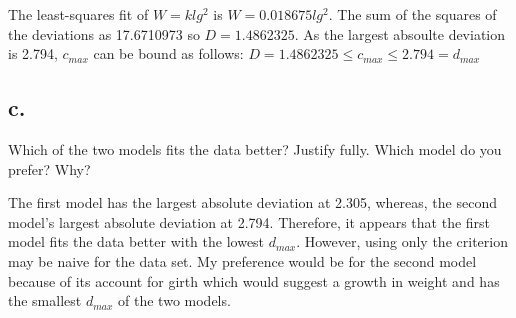 \documentclass[]{article}
\begin{document}
The least-squares fit of \(W = klg^2\) is \(W = 0.018675lg^2\). The sum
of the squares of the deviations as 17.6710973 so \(D = 1.4862325\). As
the largest absoulte deviation is 2.794, \(c_{max}\) can be bound as
follows: \(D = 1.4862325 \leq c_{max} \leq 2.794 = d_{max}\)

\subsection{c.}\label{c.}

Which of the two models fits the data better? Justify fully. Which model
do you prefer? Why?

The first model has the largest absolute deviation at 2.305, whereas,
the second model's largest absolute deviation at 2.794. Therefore, it
appears that the first model fits the data better with the lowest
\(d_{max}\). However, using only the criterion may be naive for the data
set. My preference would be for the second model because of its account
for girth which would suggest a growth in weight and has the smallest
\(d_{max}\) of the two models.
\end{document}
